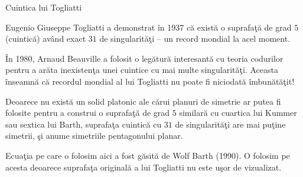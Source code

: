 \begin{surferPage}{Cuintica lui Togliatti}

   Eugenio Giuseppe Togliatti a demonstrat \^{i}n 1937 c\u{a} exist\u{a} o suprafa\c{t}\u{a} de grad $5$ (cuintic\u{a}) av\^{a}nd exact $31$ de singularit\u{a}\c{t}i 
    -- un record mondial la acel moment.
   
    \^{I}n 1980, Arnaud Beauville a folosit o leg\u{a}tur\u{a} interesant\u{a} cu teoria codurilor pentru a ar\u{a}ta inexisten\c{t}a unei cuintice cu mai multe singularit\u{a}\c{t}i.
    Aceasta \^{i}nseamn\u{a} c\u{a} recordul mondial al lui Togliatti nu poate fi niciodat\u{a} \^{i}mbun\u{a}t\u{a}\c{t}it!

      
    Deoarece nu exist\u{a} un solid platonic ale c\u{a}rui planuri de simetrie ar putea fi folosite 
    pentru a construi o suprafa\c{t}\u{a} de grad $5$ similar\u{a} cu cuartica lui Kummer sau
    sextica lui Barth, suprafa\c{t}a cuintic\u{a} cu $31$ de singularit\u{a}\c{t}i are mai pu\c{t}ine 
    simetrii, \c{s}i anume simetriile pentagonului planar.
    
    Ecua\c{t}ia pe care o folosim aici a fost g\u{a}sit\u{a} de Wolf Barth (1990). O folosim pe acesta
    deoarece suprafa\c{t}a original\u{a} a lui Togliatti nu este u\c{s}or de vizualizat.
    
\end{surferPage}
